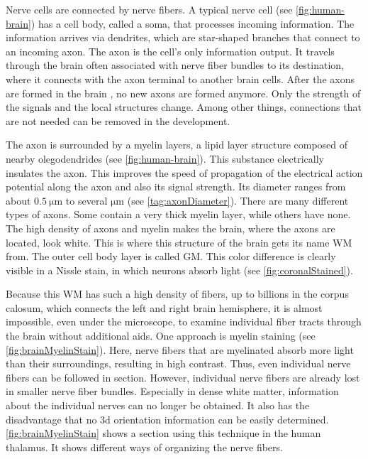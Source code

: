 %
Nerve cells are connected by nerve fibers.
A typical nerve cell (see \cref{fig:human-brain})  has a cell body, called a soma, that processes incoming information.
The information arrives via dendrites, which are star-shaped branches that connect to an incoming axon.
The axon is the cell's only information output.
It travels through the brain often associated with nerve fiber bundles to its destination, where it connects with the axon terminal to another brain cells.
After the axons are formed in the brain \dummy{}, no new axons are formed anymore.
Only the strength of the signals and the local structures change.
Among other things, connections that are not needed can be removed in the development.
\par
%
The axon is surrounded by a myelin layers, a lipid layer structure composed of nearby olegodendrides (see \cref{fig:human-brain}).
This substance electrically insulates the axon.
This improves the speed of propagation of the electrical action potential along the axon and also its signal strength.
Its diameter ranges from about $\SI{0.5}{\micro\meter}$ to several $\si{\micro\meter}$ (see \cref{tag:axonDiameter}).
There are many different types of axons.
Some contain a very thick myelin layer, while others have none.
The high density of axons and myelin makes the brain, where the axons are located, look white.
This is where this structure of the brain gets its name \ac{WM} from.
The outer cell body layer is called \ac{GM}.
This color difference is clearly visible in a Nissle stain, in which neurons absorb light (see \cref{fig:coronalStained}).
\par
%
Because this \ac{WM} has such a high density of fibers, up to billions in the corpus calosum, which connects the left and right brain hemisphere, it is almost impossible, even under the microscope, to examine individual fiber tracts through the brain without additional aids.
One approach is myelin staining (see \cref{fig:brainMyelinStain}).
Here, nerve fibers that are myelinated absorb more light than their surroundings, resulting in high contrast.
Thus, even individual nerve fibers can be followed in section.
However, individual nerve fibers are already lost in smaller nerve fiber bundles.
Especially in dense white matter, information about the individual nerves can no longer be obtained.
It also has the disadvantage that no 3d orientation information can be easily determined.
\cref{fig:brainMyelinStain} shows a section using this technique in the human thalamus.
It shows different ways of organizing the nerve fibers.
